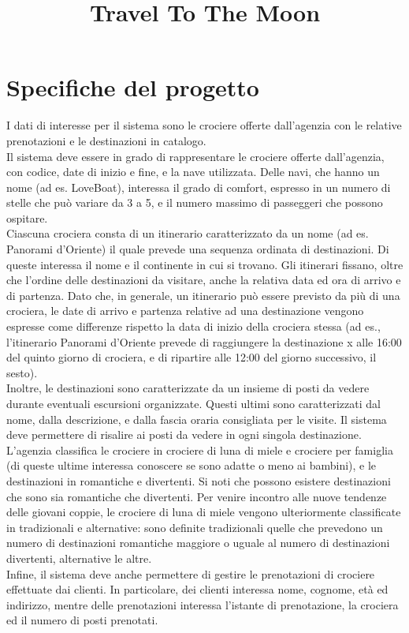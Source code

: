 \documentclass{article}
\title{Travel To The Moon}
\author{}
\date{}
\begin{document}
\maketitle

\tableofcontents

\newpage
\section{Specifiche del progetto}

I dati di interesse per il sistema sono le crociere offerte dall'agenzia con le relative prenotazioni e le destinazioni in catalogo.
\\
Il sistema deve essere in grado di rappresentare le crociere offerte dall'agenzia, con codice, date di inizio e fine, e la nave utilizzata. Delle navi, che hanno un nome (ad es. LoveBoat), interessa il grado di comfort, espresso in un numero di stelle che può variare da 3 a 5, e il numero massimo di passeggeri che possono ospitare.
\\
Ciascuna crociera consta di un itinerario caratterizzato da un nome (ad es. Panorami d'Oriente) il quale prevede una sequenza ordinata di destinazioni. Di queste interessa il nome e il continente in cui si trovano. Gli itinerari fissano, oltre che l'ordine delle destinazioni da visitare, anche la relativa data ed ora di arrivo e di partenza. Dato che, in generale, un itinerario può essere previsto da più di una crociera, le date di arrivo e partenza relative ad una destinazione vengono espresse come differenze rispetto la data di inizio della crociera stessa (ad es., l'itinerario Panorami d'Oriente prevede di raggiungere la destinazione x alle 16:00 del quinto giorno di crociera, e di ripartire alle 12:00 del giorno successivo, il sesto).
\\
Inoltre, le destinazioni sono caratterizzate da un insieme di posti da vedere durante eventuali escursioni organizzate. Questi ultimi sono caratterizzati dal nome, dalla descrizione, e dalla fascia oraria consigliata per le visite. Il sistema deve permettere di risalire ai posti da vedere in ogni singola destinazione.
\\
L'agenzia classifica le crociere in crociere di luna di miele e crociere per famiglia (di queste ultime interessa conoscere se sono adatte o meno ai bambini), e le destinazioni in romantiche e divertenti. Si noti che possono esistere destinazioni che sono sia romantiche che divertenti. Per venire incontro alle nuove tendenze delle giovani coppie, le crociere di luna di miele vengono ulteriormente classificate in tradizionali e alternative: sono definite tradizionali quelle che prevedono un numero di destinazioni romantiche maggiore o uguale al numero di destinazioni divertenti, alternative le altre.
\\
Infine, il sistema deve anche permettere di gestire le prenotazioni di crociere effettuate dai clienti. In particolare, dei clienti interessa nome, cognome, età ed indirizzo, mentre delle prenotazioni interessa l'istante di prenotazione, la crociera ed il numero di posti prenotati.
\\
\end{document}
